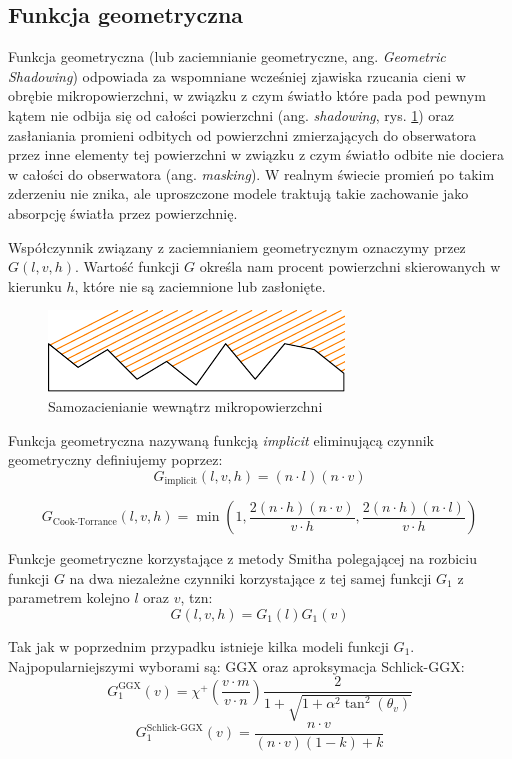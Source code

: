 \documentclass[../main.tex]{subfiles}
\begin{document}
\subsection{Funkcja geometryczna}

Funkcja geometryczna (lub zaciemnianie geometryczne, ang. \textit{Geometric
Shadowing}) odpowiada za wspomniane wcześniej zjawiska rzucania cieni w obrębie
mikropowierzchni, w związku z czym światło które pada pod pewnym kątem nie
odbija się od całości powierzchni (ang. \textit{shadowing}, rys.
\ref{fig:GeometricShadowing}) oraz zasłaniania promieni odbitych od powierzchni
zmierzających do obserwatora przez inne elementy tej powierzchni w związku z
czym światło odbite nie dociera w całości do obserwatora (ang.
\textit{masking}). W realnym świecie promień po takim zderzeniu nie znika, ale
uproszczone modele traktują takie zachowanie jako absorpcję światła przez
powierzchnię.

Współczynnik związany z zaciemnianiem geometrycznym oznaczymy przez $G(l,v,h)$.
Wartość funkcji $G$ określa nam procent powierzchni skierowanych w kierunku
$h$, które nie są zaciemnione lub zasłonięte.

\begin{figure}[h]
  \centering
  \includegraphics{illustrations/pbr/geometry_shadowing.pdf}
  \vspace{0.25cm}
  \caption{Samozacienianie wewnątrz mikropowierzchni}
  \label{fig:GeometricShadowing}
\end{figure}

Funkcja geometryczna nazywaną funkcją \textit{implicit} eliminującą czynnik
geometryczny definiujemy poprzez:
\[
  G_{\text{implicit}}(l,v,h) =
    (n \cdot l) (n \cdot v)
\]

\[
  G_{\text{Cook-Torrance}}(l,v,h) =
    \min \left(
      1,
      \frac{2(n \cdot h)(n \cdot v)}{
        v \cdot h
      },
      \frac{2(n \cdot h)(n \cdot l)}{
        v \cdot h
      }
    \right)
\]

Funkcje geometryczne korzystające z metody Smitha polegającej na rozbiciu
funkcji $G$ na dwa niezależne czynniki korzystające z tej samej funkcji $G_1$
z parametrem kolejno $l$ oraz $v$, tzn:
\[
  G(l,v,h) = G_1(l) G_1(v)
\]

Tak jak w poprzednim przypadku istnieje kilka modeli funkcji $G_1$.
Najpopularniejszymi wyborami są: GGX oraz aproksymacja Schlick-GGX:
\[
  G_{1}^{\text{GGX}}(v) =
    \chi^{+}\left(\frac{v \cdot m}{v \cdot n}\right)
    \frac{2}{
      1 + \sqrt{
        1 + \alpha^2 \tan^{2}\left(\theta_v\right)
      }
    }
\]
\[
  G_{1}^{\text{Schlick-GGX}}(v) =
    \frac{n \cdot v}{
      (n \cdot v)(1 - k) + k
    }
\]
\end{document}
